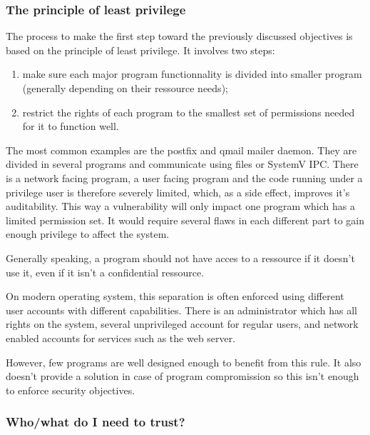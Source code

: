 \documentclass[pdftex,a4paper,titlepage,11pt]{article}
\begin{document}
\subsubsection{The principle of least privilege}

The process to make the first step toward the previously discussed objectives is
based on the principle of least privilege. It involves two steps:
\begin{enumerate}
	\item make sure each major program functionnality is divided into smaller
program (generally depending on their ressource needs);
	\item restrict the rights of each program to the smallest set of permissions
needed for it to function well.
\end{enumerate}

\smallskip

The most common examples are the postfix and qmail mailer daemon. They are
divided in several programs and communicate using files or SystemV IPC. There is
a network facing program, a user facing program and the code running under a
privilege user is therefore severely limited, which, as a side effect, improves
it's auditability. This way a vulnerability will only impact one program which
has a limited permission set. It would require several flaws in each different
part to gain enough privilege to affect the system.

\bigskip

Generally speaking, a program should not have acces to a ressource if it doesn't
use it, even if it isn't a confidential ressource.

\bigskip

On modern operating system, this separation is often enforced using different
user accounts with different capabilities. There is an administrator which has
all rights on the system, several unprivileged account for regular users,
and network enabled accounts for services such as the web server.

\bigskip

However, few programs are well designed enough to benefit from this rule. It
also doesn't provide a solution in case of program compromission so this isn't
enough to enforce security objectives.


\subsubsection{Who/what do I need to trust?}
\end{document}
